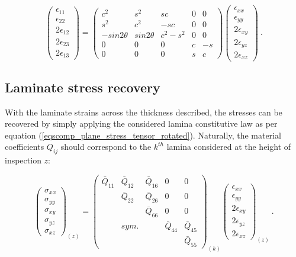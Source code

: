 \begin{equation} 
\begin{pmatrix}
\epsilon_{11} \\
\epsilon_{22} \\
2\epsilon_{12}\\
2\epsilon_{23} \\
2\epsilon_{13}
\end{pmatrix}
 =
\begin{pmatrix}
c^2 & s^2 & sc & 0 & 0 \\
s^2 & c^2 & -sc & 0 & 0 \\
-sin2\theta & sin2\theta & c^2 - s^2 & 0 & 0 \\
0 & 0 & 0 & c & -s \\
0 & 0 & 0 & s & c
\end{pmatrix}
\begin{pmatrix}
\epsilon_{xx} \\
\epsilon_{yy} \\
2\epsilon_{xy}\\
2\epsilon_{yz} \\
2\epsilon_{xz}
\end{pmatrix}
\label{eqscomp_strain_recovery7}\ .
\end{equation}

\subsection{Laminate stress recovery}

With the laminate strains across the thickness described, the stresses can be recovered by simply applying the considered lamina constitutive law as per equation (\ref{eqscomp_plane_stress_tensor_rotated}). Naturally, the material coefficients $Q_{ij}$ should correspond to the $k^{th}$ lamina considered at the height of inspection $z$:

\begin{equation} 
{\begin{pmatrix}
\sigma_{xx} \\
\sigma_{yy} \\
\sigma_{xy} \\
\sigma_{yz} \\
\sigma_{xz} 
\end{pmatrix}}_{(z)}
=
{\begin{pmatrix}
\bar{Q}_{11} & \bar{Q}_{12} &  \bar{Q}_{16} & 0 & 0 \\
\  & \bar{Q}_{22} &  \bar{Q}_{26} & 0 & 0 \\
\  & \  & \bar{Q}_{66}  & 0 & 0 \\
\  & sym. & \  & \bar{Q}_{44} & \bar{Q}_{45} \\
\  & \  & \  & \ & \bar{Q}_{55}
\end{pmatrix}}_{(k)}
{\begin{pmatrix}
\epsilon_{xx} \\
\epsilon_{yy} \\
2\epsilon_{xy}\\
2\epsilon_{yz} \\
2\epsilon_{xz}
\end{pmatrix}}_{(z)}
\label{eqscomp_stress_recovery1}\ .
\end{equation}

